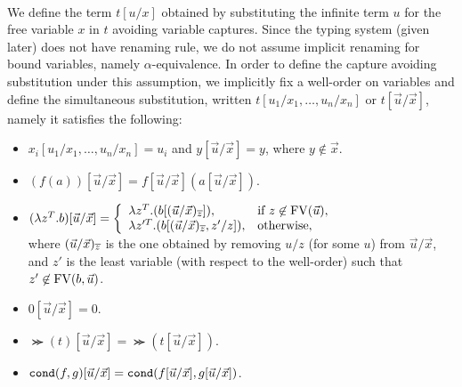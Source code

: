 \\

We define the term $t[u/x]$ obtained by substituting the infinite term $u$ for the free variable $x$ in $t$ 
avoiding variable captures.
Since the typing system (given later) does not have renaming rule,
we do not assume implicit renaming for bound variables, namely $\alpha$-equivalence.
In order to define the capture avoiding substitution under this assumption, 
we implicitly fix a well-order on variables
and define the simultaneous substitution,
written $t[u_1/x_1,\ldots,u_n/x_n]$ or $t[\vec{u}/{\vec{x}}]$,
namely it satisfies the following:
\begin{itemize}
\item
  $x_i[u_1/x_1,\ldots,u_n/x_n] = u_i$ and $y[\vec{u}/\vec{x}] = y$, where $y\not\in\vec{x}$. 
\item
  $(f(a))[\vec{u}/\vec{x}] = f[\vec{u}/\vec{x}](a[\vec{u}/\vec{x}])$.
\item
  $(\lambda z^T.b)[\vec{u}/\vec{x}] =
  \left\{
  \begin{array}{ll}
    \lambda z^T.(b[(\vec{u}/\vec{x})_{\overline{z}}]),
    &
    \text{if $z \not\in {{\rm FV}}(\vec{u})$},
    \\
    \lambda z'^T.(b[(\vec{u}/\vec{x})_{\overline{z}},z'/z]),
    &
    \text{otherwise},
  \end{array}
  \right.$
  \\
  where
  $(\vec{u}/\vec{x})_{\overline{z}}$ is the one obtained by removing $u/z$ (for some $u$) from $\vec{u}/\vec{x}$,
  and 
  $z'$ is the least variable (with respect to the well-order)
  such that $z' \not\in {{\rm FV}}(b,\vec{u})$.
\item
  $0[\vec{u}/\vec{x}] = 0$.
\item
  $\Succ(t)[\vec{u}/\vec{x}] = \Succ(t[\vec{u}/\vec{x}])$.
\item
  ${\tt cond}(f,g)[\vec{u}/\vec{x}] = {\tt cond}(f[\vec{u}/\vec{x}],g[\vec{u}/\vec{x}])$.
\end{itemize}

